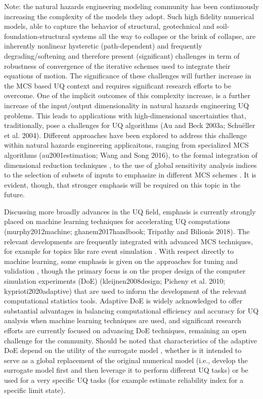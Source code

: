 Note: the natural hazards engineering modeling community has been continuously increasing the complexity of the models they adopt. Such high fidelity numerical models, able to capture the behavior of structural, geotechnical and soil-foundation-structural systems all the way to collapse or the brink of collapse, are inherently nonlinear hysteretic (path-dependent) and frequently degrading/softening and therefore present (significant) challenges in term of robustness of convergence of the iterative schemes used to integrate their equations of motion. The significance of these challenges will further increase in the MCS based UQ context and requires significant research efforts to be overcome. One of the implicit outcomes of this complexity increase, is a further increase of the input/output dimensionality in natural hazards engineering UQ problems. This leads to applications with high-dimensional uncertainties that, traditionally, pose a challenges for UQ algorithms (Au and Beck 2003a; Schuëller et al. 2004). Different approaches have been explored to address this challenge within natural hazards engineering applicaitons, ranging from specialized MCS algorithms (au2001estimation; Wang and Song 2016), to the formal integration of dimensional reduction techniques \citep{jia2013kriging}, to the use of global sensitivity analysis indices to the selection of subsets of inputs to emphasize in different MCS schemes \citep{jia2014adaptive}. It is evident, though, that stronger emphasis will be required on this topic in the future.     

Discussing more broadly advances in the UQ field, emphasis is currently strongly placed on machine learning techniques for accelerating UQ computations (murphy2012machine; ghanem2017handbook; Tripathy and Bilionis 2018). The relevant developments are frequently integrated with advanced MCS techniques, for example for topics like rare event simulation \citep{li2011efficient,balesdent2013krigingbased,bourinet2016rareevent}. With respect directly to machine learning, some emphasis is given on the approaches for tuning and validation \citep{mehmani2018concurrent}, though the primary focus is on the proper design of the computer simulation experiments (DoE) (kleijnen2008design; Picheny et al. 2010; kyprioti2020adaptive) that are used to inform the development of the relevant computational statistics tools. Adaptive DoE is widely acknowledged to offer substantial advantages in balancing computational efficiency and accuracy for UQ analysis when machine learning techniques are used, and significant research efforts are currently focused on advancing DoE techniques, remaining an open challenge for the community. Should be noted that characteristics of the adaptive DoE depend on the utility of the surrogate model \citep{liu2018survey}, whether is it intended to serve as a global replacement of the original numerical model (i.e., develop the surrogate model first and then leverage it to perform different UQ tasks) or be used for a very specific UQ tasks (for example estimate reliability index for a specific limit state). 

